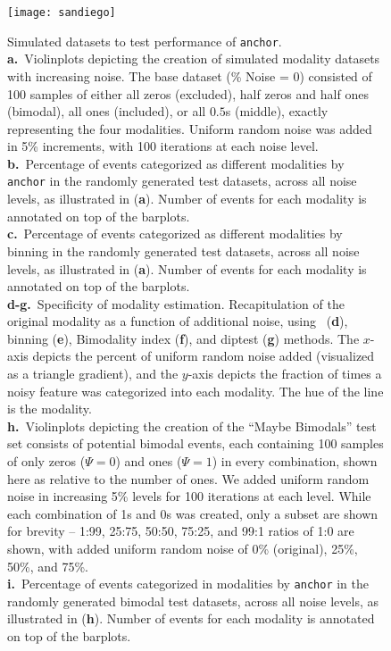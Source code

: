 \begin{figure}[h] 
  \centering
  \texttt{[image: sandiego]}
  \caption[Simulated datasets to test performance of \texttt{anchor}.]{
  Simulated datasets to test performance of \texttt{anchor}.\\
\textbf{a.}~Violinplots depicting the creation of simulated modality datasets with increasing noise. The base dataset (\% Noise = 0) consisted of 100 samples of either all zeros (excluded), half zeros and half ones (bimodal), all ones (included), or all $0.5$s (middle), exactly representing the four modalities. Uniform random noise was added in 5\% increments, with 100 iterations at each noise level.
\textbf{b.}~Percentage of events categorized as different modalities by \texttt{anchor} in the randomly generated test datasets, across all noise levels, as illustrated in (\textbf{a}). Number of events for each modality is annotated on top of the barplots. \\
\textbf{c.}~Percentage of events categorized as different modalities by binning in the randomly generated test datasets, across all noise levels, as illustrated in (\textbf{a}). Number of events for each modality is annotated on top of the barplots. \\
\textbf{d-g.}~Specificity of modality estimation. Recapitulation of the original modality as a function of additional noise, using \anchor\, (\textbf{d}), binning (\textbf{e}), Bimodality index (\textbf{f}), and diptest (\textbf{g}) methods. The $x$-axis depicts the percent of uniform random noise added (visualized as a triangle gradient), and the $y$-axis depicts the fraction of times a noisy feature was categorized into each modality. The hue of the line is the modality. \\
\textbf{h.}~Violinplots depicting the creation of the ``Maybe Bimodals'' test set consists of potential bimodal events, each containing 100 samples of only zeros ($\Psi = 0$) and ones ($\Psi = 1$) in every combination, shown here as relative to the number of ones. We added uniform random noise in increasing 5\% levels for 100 iterations at each level. While each combination of 1s and 0s was created, only a subset are shown for brevity -- 1:99, 25:75, 50:50, 75:25, and 99:1 ratios of 1:0 are shown, with added uniform random noise of 0\% (original), 25\%, 50\%, and 75\%.\\
\textbf{i.}~Percentage of events categorized in modalities by \texttt{anchor} in the randomly generated bimodal test datasets, across all noise levels, as illustrated in (\textbf{h}). Number of events for each modality is annotated on top of the barplots. \\
}
\end{figure}
